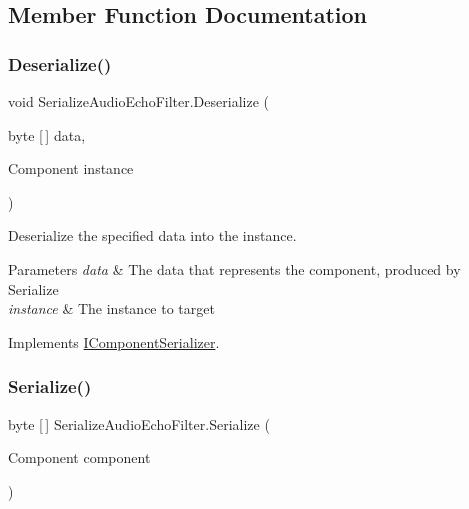 \subsection{Member Function Documentation}
\mbox{\label{class_serialize_audio_echo_filter_ad5beda12b5d39b678ce291ee1c13374c}} 
\subsubsection{\texorpdfstring{Deserialize()}{Deserialize()}}
{\footnotesize\ttfamily void Serialize\+Audio\+Echo\+Filter.\+Deserialize (\begin{DoxyParamCaption}\item[{byte \mbox{[}$\,$\mbox{]}}]{data,  }\item[{Component}]{instance }\end{DoxyParamCaption})\hspace{0.3cm}{\ttfamily [inline]}}



Deserialize the specified data into the instance. 


\begin{DoxyParams}{Parameters}
{\em data} & The data that represents the component, produced by Serialize \\
\hline
{\em instance} & The instance to target \\
\hline
\end{DoxyParams}


Implements \hyperlink{interface_i_component_serializer_a4cc366a5c78b33d47a90c209d8fed883}{I\+Component\+Serializer}.

\mbox{\label{class_serialize_audio_echo_filter_a05a44375abc89e383547960120fb55e6}} 
\subsubsection{\texorpdfstring{Serialize()}{Serialize()}}
{\footnotesize\ttfamily byte \mbox{[}$\,$\mbox{]} Serialize\+Audio\+Echo\+Filter.\+Serialize (\begin{DoxyParamCaption}\item[{Component}]{component }\end{DoxyParamCaption})\hspace{0.3cm}{\ttfamily [inline]}}



